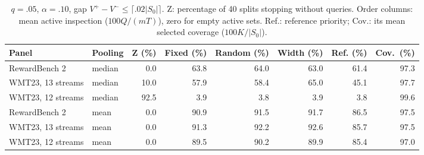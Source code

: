 \begin{table}[t]
\centering\small
\begin{tabular}{llrrrrrr}
\toprule
Panel & Pooling & Z (\%) & Fixed (\%) & Random (\%) & Width (\%) & Ref. (\%) & Cov.\ (\%) \\
\midrule
RewardBench 2 & median & 0.0 & 63.8 & 64.0 & 63.0 & 61.4 & 97.3 \\
WMT23, 13 streams & median & 10.0 & 57.9 & 58.4 & 65.0 & 45.1 & 97.7 \\
WMT23, 12 streams & median & 92.5 & 3.9 & 3.8 & 3.9 & 3.8 & 99.6 \\
RewardBench 2 & mean & 0.0 & 90.9 & 91.5 & 91.7 & 86.5 & 97.5 \\
WMT23, 13 streams & mean & 0.0 & 91.3 & 92.2 & 92.6 & 85.7 & 97.5 \\
WMT23, 12 streams & mean & 0.0 & 89.5 & 90.2 & 89.9 & 85.4 & 97.0 \\
\bottomrule
\end{tabular}
\caption{$q=.05$, $\alpha=.10$, gap $V^+-V^-\le\lceil.02|S_0|\rceil$. Z: percentage of 40 splits stopping without queries. Order columns: mean active inspection ($100Q/(mT)$), zero for empty active sets. Ref.: reference priority; Cov.: its mean selected coverage ($100K/|S_0|$).}
\label{tab:stopping}
\end{table}
